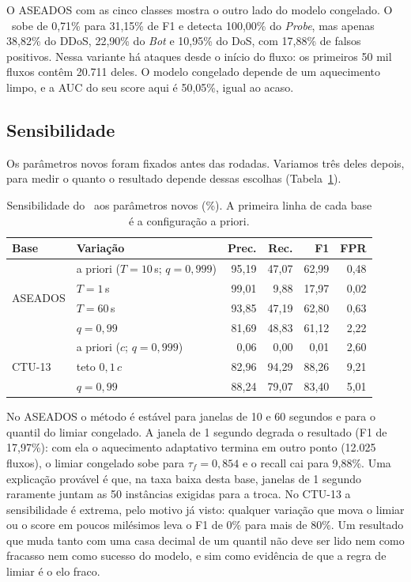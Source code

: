 O ASEADOS com as cinco classes mostra o outro lado do modelo congelado. O \modusp\ sobe de 0,71\%
para 31,15\% de F1 e detecta 100,00\% do \emph{Probe}, mas apenas 38,82\% do DDoS, 22,90\% do
\emph{Bot} e 10,95\% do DoS, com 17,88\% de falsos positivos. Nessa variante há ataques
desde o início do fluxo: os primeiros 50 mil fluxos contêm 20.711 deles. O modelo congelado
depende de um aquecimento limpo, e a AUC do seu score aqui é 50,05\%, igual ao acaso.

\subsection{Sensibilidade}
\label{sec:sens}
Os parâmetros novos foram fixados antes das rodadas. Variamos três deles depois, para medir o quanto
o resultado depende dessas escolhas (Tabela~\ref{tab:sens}).

\begin{table}[t]
\centering
\caption{Sensibilidade do \modusp\ aos parâmetros novos (\%). A primeira linha de cada base é a
configuração a priori.}
\label{tab:sens}
\setlength{\tabcolsep}{3pt}
\begin{tabular}{llrrrr}
\toprule
Base & Variação & Prec. & Rec. & F1 & FPR \\
\midrule
\multirow{4}{*}{ASEADOS}
 & a priori ($T=10$\,s; $q=0{,}999$) & 95,19 & 47,07 & 62,99 & 0,48 \\
 & $T=1$\,s        & 99,01 &  9,88 & 17,97 & 0,02 \\
 & $T=60$\,s       & 93,85 & 47,19 & 62,80 & 0,63 \\
 & $q=0{,}99$      & 81,69 & 48,83 & 61,12 & 2,22 \\
\midrule
\multirow{3}{*}{CTU-13}
 & a priori ($c$; $q=0{,}999$)       &  0,06 &  0,00 &  0,01 & 2,60 \\
 & teto $0{,}1\,c$ & 82,96 & 94,29 & 88,26 & 9,21 \\
 & $q=0{,}99$      & 88,24 & 79,07 & 83,40 & 5,01 \\
\bottomrule
\end{tabular}
\end{table}

No ASEADOS o método é estável para janelas de 10 e 60 segundos e para o quantil do limiar
congelado. A janela de 1 segundo degrada o resultado (F1 de 17,97\%): com ela o aquecimento
adaptativo termina em outro ponto (12.025 fluxos), o limiar congelado sobe para $\tau_f=0{,}854$ e
o recall cai para 9,88\%. Uma explicação provável é que, na taxa baixa desta base, janelas de
1 segundo raramente juntam as 50 instâncias exigidas para a troca. No CTU-13 a sensibilidade é extrema, pelo motivo já visto: qualquer variação que
mova o limiar ou o score em poucos milésimos leva o F1 de 0\% para mais de 80\%. Um resultado que
muda tanto com uma casa decimal de um quantil não deve ser lido nem como fracasso nem como sucesso
do modelo, e sim como evidência de que a regra de limiar é o elo fraco.

